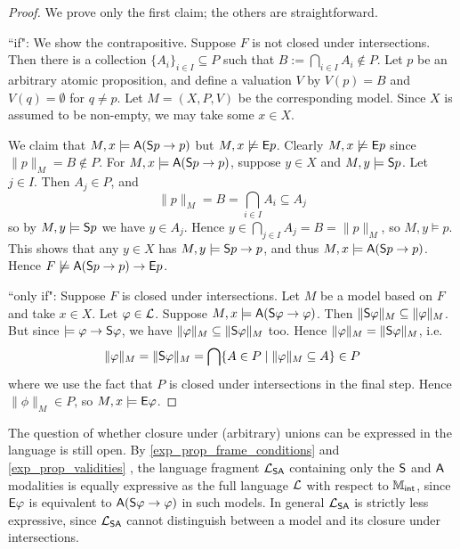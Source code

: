 \begin{proof}

    We prove only the first claim; the others are straightforward.

    ``if": We show the contrapositive. Suppose $F$ is not closed under
    intersections. Then there is a collection $\{A_i\}_{i \in I} \subseteq P$
    such that $B := \bigcap_{i \in I}A_i \notin P$. Let $p$ be an arbitrary
    atomic proposition, and define a valuation $V$ by $V(p) = B$ and $V(q) =
    \emptyset$ for $q \ne p$. Let $M = (X, P, V)$ be the corresponding model.
    Since $X$ is assumed to be non-empty, we may take some $x \in X$.

    We claim that $M, x \models \A(\S p \limplies p)$ but $M, x
    \not\models \E p$. Clearly $M, x \not\models \E p$ since
    $\|p\|_M = B \notin P$. For $M, x \models \A(\S p \limplies
    p)$, suppose $y \in X$ and $M, y \models \S p$. Let $j
    \in I$. Then $A_j \in P$, and
    \[
        \|p\|_M
        = B
        = \bigcap_{i \in I}{A_i}
        \subseteq A_j
    \]
    so by $M, y \models \S p$ we have $y \in A_j$. Hence $y
    \in \bigcap_{j \in I}A_j = B = \|p\|_M$, so $M, y \models p$. This
    shows that any $y \in X$ has $M, y \models \S p \limplies p$,
    and thus $M, x \models \A(\S p \limplies p)$. Hence $F
    \not\models \A(\S p \limplies p) \limplies \E p$.

    ``only if": Suppose $F$ is closed under intersections. Let $M$
    be a model based on $F$ and take $x \in X$. Let $\phi
    \in \cL$. Suppose $M, x \models \A(\S\phi \limplies \phi)$. Then
    $\|\S\phi\|_M \subseteq \|\phi\|_M$. But since $\models \phi
    \limplies \S\phi$, we have $\|\phi\|_M \subseteq \|\S\phi\|_M$ too.
    Hence $\|\phi\|_M = \|\S\phi\|_M$, i.e.
    \[
        \|\phi\|_M
        = \|\S\phi\|_M
        = \bigcap\{A \in P \mid \|\phi\|_M \subseteq A\}
        \in P
    \]
    where we use the fact that $P$ is closed under intersections in the
    final step. Hence $\|\phi\|_M \in P$, so $M, x \models
    \E\phi$.
\end{proof}

The question of whether closure under (arbitrary) unions can be expressed in
the language is still open. By \cref{exp_prop_frame_conditions}
 and \cref{exp_prop_validities}
, the language fragment $\cLSA$ containing only the $\S$
and $\A$ modalities is equally expressive as the full language $\cL$ with
respect to $\Mint$, since $\E\phi$ is equivalent to $\A(\S\phi \limplies \phi)$
in such models. In general $\cLSA$ is strictly less expressive, since $\cLSA$
cannot distinguish between a model and its closure under intersections.

